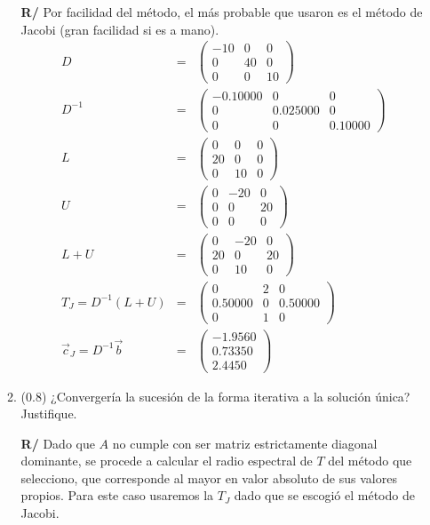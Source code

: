 \documentclass[12pt]{article}
\begin{document}
\begin{enumerate}[leftmargin=*,widest=9]
\begin{enumerate}[label=\alph*]
    \textbf{R/} Por facilidad del método, el más probable que usaron es el método de Jacobi (gran facilidad si es a mano).
    \begin{eqnarray*}
    D &=& \begin{pmatrix}
    -10 & 0 & 0\\ 0 & 40 & 0\\ 0 & 0 & 10
    \end{pmatrix} \\
    D^{-1} &=& \begin{pmatrix}
    -0.10000 & 0 & 0\\ 0 & 0.025000 & 0\\ 0 & 0 & 0.10000
    \end{pmatrix} \\
    L & = & \begin{pmatrix}
    0 & 0 & 0\\ 20 & 0 & 0\\ 0 & 10 & 0
    \end{pmatrix} \\
    U & = & \begin{pmatrix}
    0 & -20 & 0\\ 0 & 0 & 20\\ 0 & 0 & 0
    \end{pmatrix} \\
    L + U & = & \begin{pmatrix}
    0 & -20 & 0\\ 20 & 0 & 20\\ 0 & 10 & 0
    \end{pmatrix} \\
    T_J = D^{-1}(L+U) & = & \begin{pmatrix}
    0 & 2 & 0\\ 0.50000 & 0 & 0.50000\\ 0 & 1 & 0
    \end{pmatrix} \\
    \vec{c}_J= D^{-1}\vec{b} & = & \begin{pmatrix}
    -1.9560 \\ 0.73350 \\ 2.4450 
    \end{pmatrix}
    \end{eqnarray*}
    
    \item (\(0.8\)) ¿Convergería la sucesión de la forma iterativa a la solución única? Justifique.
    
    \textbf{R/} Dado que \(A\) no cumple con ser matriz estrictamente diagonal dominante, se procede a calcular el radio espectral de \(T\) del método que selecciono, que corresponde al mayor en valor absoluto de sus valores propios. Para este caso usaremos la \(T_J\) dado que se escogió el método de Jacobi.
    

\end{enumerate}
\end{enumerate}
\end{document}
